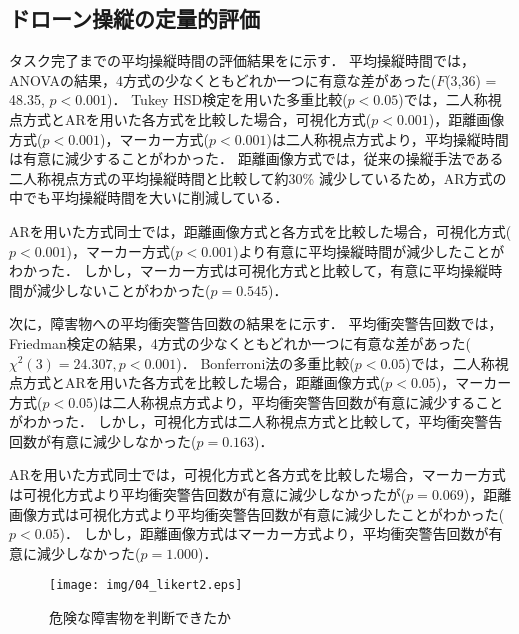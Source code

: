 \documentclass[submit, sigrecommended]{ipsj}
\begin{document}
\subsection{ドローン操縦の定量的評価}
\label{result_1}
タスク完了までの平均操縦時間の評価結果をに示す．
平均操縦時間では，ANOVAの結果，4方式の少なくともどれか一つに有意な差があった($F$(3,36) = 48.35, $p < 0.001 $)．
Tukey HSD検定を用いた多重比較($p < 0.05$)では，二人称視点方式とARを用いた各方式を比較した場合，可視化方式($p < 0.001$)，距離画像方式($p < 0.001$)，マーカー方式($p < 0.001$)は二人称視点方式より，平均操縦時間は有意に減少することがわかった．
距離画像方式では，従来の操縦手法である二人称視点方式の平均操縦時間と比較して約30\% 減少しているため，AR方式の中でも平均操縦時間を大いに削減している．
\par
ARを用いた方式同士では，距離画像方式と各方式を比較した場合，可視化方式($p < 0.001$)，マーカー方式($p < 0.001$)より有意に平均操縦時間が減少したことがわかった．
しかし，マーカー方式は可視化方式と比較して，有意に平均操縦時間が減少しないことがわかった($p = 0.545$)．
\par
次に，障害物への平均衝突警告回数の結果をに示す．
平均衝突警告回数では，Friedman検定の結果，4方式の少なくともどれか一つに有意な差があった($\chi^{2}(3)=24.307, p < 0.001$)．
Bonferroni法の多重比較($p < 0.05$)では，二人称視点方式とARを用いた各方式を比較した場合，距離画像方式($p < 0.05$)，マーカー方式($p < 0.05$)は二人称視点方式より，平均衝突警告回数が有意に減少することがわかった．
しかし，可視化方式は二人称視点方式と比較して，平均衝突警告回数が有意に減少しなかった($p = 0.163$)．
\par
ARを用いた方式同士では，可視化方式と各方式を比較した場合，マーカー方式は可視化方式より平均衝突警告回数が有意に減少しなかったが($p = 0.069$)，距離画像方式は可視化方式より平均衝突警告回数が有意に減少したことがわかった($p < 0.05$)．
しかし，距離画像方式はマーカー方式より，平均衝突警告回数が有意に減少しなかった($p = 1.000$)．


\begin{figure}[tb]
  \centering
  \texttt{[image: img/04\_likert2.eps]}
  \caption{危険な障害物を判断できたか}
  \label{fig:04_likert2}
  \end{figure}
  
\end{document}
